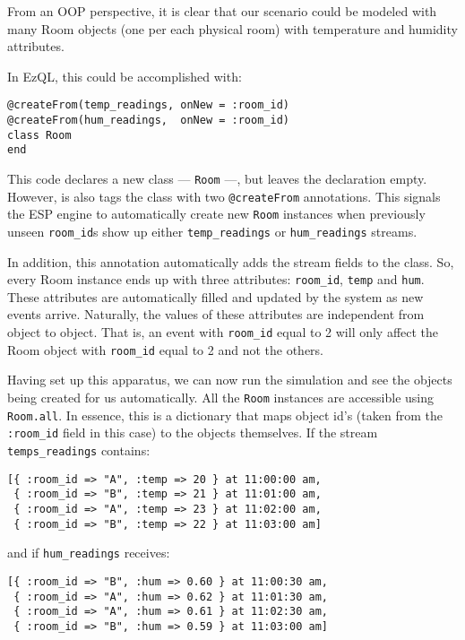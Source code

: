 \documentclass{report}
\begin{document}
From an OOP perspective, it is clear that our scenario could be
modeled with many Room objects (one per each physical room) with
temperature and humidity attributes.

In EzQL, this could be accomplished with:

\begin{verbatim}
@createFrom(temp_readings, onNew = :room_id)
@createFrom(hum_readings,  onNew = :room_id)
class Room
end
\end{verbatim}

This code declares a new class --- \verb=Room= ---, but leaves the
declaration empty. However, is also tags the class with two
\verb=@createFrom= annotations. This signals the ESP engine to
automatically create new \verb=Room= instances when previously unseen
\verb=room_id=s show up either \verb=temp_readings= or
\verb=hum_readings= streams.

In addition, this annotation automatically adds the stream fields to
the class. So, every Room instance ends up with three attributes:
\verb=room_id=, \verb=temp= and \verb=hum=. These attributes are
automatically filled and updated by the system as new events
arrive. Naturally, the values of these attributes are independent from
object to object. That is, an event with \verb=room_id= equal to 2
will only affect the Room object with \verb=room_id= equal to 2 and
not the others.

Having set up this apparatus, we can now run the simulation and see
the objects being created for us automatically. All the \verb=Room=
instances are accessible using \verb=Room.all=. In essence, this is a
dictionary that maps object id's (taken from the \verb=:room_id= field
in this case) to the objects themselves. If the stream
\verb=temps_readings= contains:

\begin{verbatim}
[{ :room_id => "A", :temp => 20 } at 11:00:00 am,
 { :room_id => "B", :temp => 21 } at 11:01:00 am,
 { :room_id => "A", :temp => 23 } at 11:02:00 am,
 { :room_id => "B", :temp => 22 } at 11:03:00 am]
\end{verbatim}

and if \verb=hum_readings= receives:

\begin{verbatim}
[{ :room_id => "B", :hum => 0.60 } at 11:00:30 am,
 { :room_id => "A", :hum => 0.62 } at 11:01:30 am,
 { :room_id => "A", :hum => 0.61 } at 11:02:30 am,
 { :room_id => "B", :hum => 0.59 } at 11:03:00 am]
\end{verbatim}
\end{document}
